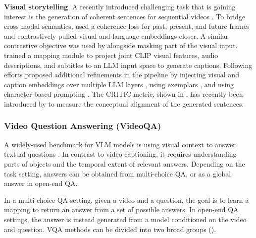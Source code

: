 \noindent
\textbf{Visual storytelling}. A recently introduced challenging task that is gaining interest is the generation of coherent sentences for sequential videos \citep{li2019video}. To bridge cross-modal semantics, \citet{yu2021transitional} used a coherence loss for past, present, and future frames and contrastively pulled visual and language embeddings closer. A similar contrastive objective was used by \citep{xiao2022hierarchical} alongside masking part of the visual input. \citet{han2023autoad} trained a mapping module to project joint CLIP visual features, audio descriptions, and subtitles to an LLM input space to generate captions. Following efforts proposed additional refinements in the pipeline by injecting visual and caption embeddings over multiple LLM layers \citep{han2023autoadii}, using exemplars \citep{han2024autoadiii}, and using character-based prompting \citep{xie2024autoad}. The CRITIC metric, shown in , has recently been introduced by \citet{han2024autoadiii} to measure the conceptual alignment of the generated sentences.




\subsubsection{Video Question Answering (VideoQA)}

A widely-used benchmark for VLM models is using visual context to answer textual questions \citep{antol2015vqa,goyal2017making}. In contrast to video captioning, it requires understanding parts of objects and the temporal extent of relevant answers. Depending on the task setting, answers can be obtained from multi-choice QA, or as a global answer in open-end QA. 

In a multi-choice QA setting, given a video and a question, the goal is to learn a mapping to return an answer from a set of possible answers. In open-end QA settings, the answer is instead generated from a model conditioned on the video and question. VQA methods can be divided into two broad groups ().

